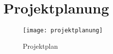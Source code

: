 \section{Projektplanung}
\begin{figure}[H]
	\centering
	\texttt{[image: projektplanung]}
	\caption{Projektplan}
	\label{fig:Projektplan}
\end{figure}